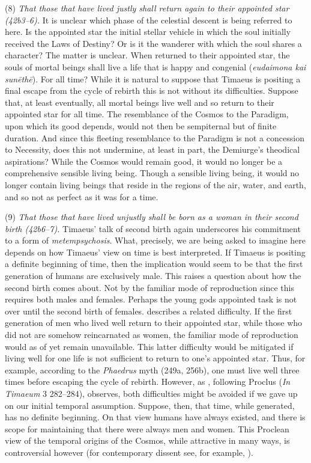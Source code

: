 (8) \emph{That those that have lived justly shall return again to their appointed star (42b3--6).} It is unclear which phase of the celestial descent is being referred to here. Is the appointed star the initial stellar vehicle in which the soul initially received the Laws of Destiny? Or is it the wanderer with which the soul shares a character? The matter is unclear. When returned to their appointed star, the souls of mortal beings shall live a life that is happy and congenial (\emph{eudaimona kai sunēthē}). For all time? While it is natural to suppose that Timaeus is positing a final escape from the cycle of rebirth this is not without its difficulties. Suppose that, at least eventually, all mortal beings live well and so return to their appointed star for all time. The resemblance of the Cosmos to the Paradigm, upon which its good depends, would not then be sempiternal but of finite duration. And since this fleeting resemblance to the Paradigm is not a concession to Necessity, does this not undermine, at least in part, the Demiurge's theodical aspirations? While the Cosmos would remain good, it would no longer be a comprehensive sensible living being. Though a sensible living being, it would no longer contain living beings that reside in the regions of the air, water, and earth, and so not as perfect as it was for a time.

(9) \emph{That those that have lived unjustly shall be born as a woman in their second birth (42b6--7).} Timaeus' talk of second birth again underscores his commitment to a form of \emph{metempsychosis}. What, precisely, we are being asked to imagine here depends on how Timaeus' view on time is best interpreted. If Timaeus is positing a definite beginning of time, then the implication would seem to be that the first generation of humans are exclusively male. This raises a question about how the second birth comes about. Not by the familiar mode of reproduction since this requires both males and females. Perhaps the young gods appointed task is not over until the second birth of females. \citet[261]{Taylor:1928qb} describes a related difficulty. If the first generation of men who lived well return to their appointed star, while those who did not are somehow reincarnated as women, the familiar mode of reproduction would as of yet remain unavailable. This latter difficulty would be mitigated if living well for one life is not sufficient to return to one's appointed star. Thus, for example, according to the \emph{Phaedrus} myth (249a, 256b), one must live well three times before escaping the cycle of rebirth. However, as \citet[145--6]{Cornford:1935fk}, following Proclus (\emph{In Timaeum} 3 282--284), observes, both difficulties might be avoided if we gave up on our initial temporal assumption. Suppose, then, that time, while generated, has no definite beginning. On that view humans have always existed, and there is scope for maintaining that there were always men and women. This Proclean view of the temporal origins of the Cosmos, while attractive in many ways, is controversial however (for contemporary dissent see, for example, \citealt[chapter 2]{Mohr:2005xe}).

